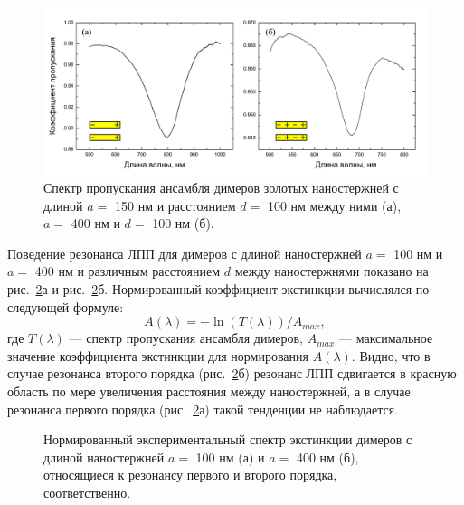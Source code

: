 \begin{figure}[!h]
\centering
\includegraphics[width=1\linewidth]{img/microspectroscopy/spectra_1-2res.pdf}
\caption{Спектр пропускания ансамбля димеров золотых наностержней с длиной $ a = $ 150 нм и расстоянием $ d = $  100 нм между ними (а), $ a = $ 400 нм и $ d = $ 100 нм (б).}
\label{img:spectra}
\end{figure}

Поведение резонанса ЛПП для димеров с длиной наностержней $ a = $ 100 нм и $ a = $ 400 нм и различным расстоянием $ d $ между наностержнями показано на рис.~\ref{img:extinction}а и рис.~\ref{img:extinction}б. Нормированный коэффициент экстинкции вычислялся по следующей формуле:
\begin{equation}
A(\lambda) = - \ln (T(\lambda))/A_{max},
\end{equation}
где $ T(\lambda) $ --- спектр пропускания ансамбля димеров, $ A_{max} $ --- максимальное значение коэффициента экстинкции для нормирования $ A(\lambda) $. Видно, что в случае резонанса второго порядка (рис.~\ref{img:extinction}б) резонанс ЛПП сдвигается в красную область по мере увеличения расстояния между наностержней, а в случае резонанса первого порядка (рис.~\ref{img:extinction}а) такой тенденции не наблюдается.
\begin{figure}
\caption{Нормированный экспериментальный спектр экстинкции димеров с длиной наностержней $ a = $ 100 нм (а) и $ a = $ 400 нм (б), относящиеся к резонансу первого и второго порядка, соответственно.}
\label{img:extinction}
\end{figure}

